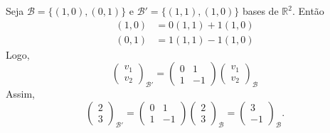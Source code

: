 \begin{exemplo*}
  Seja ${\mathcal{B}} = \{(1,0),(0,1)\}$ e ${\mathcal{B}}' = \{(1,1), (1,0)\}$ bases de ${\mathbb{R}}^2$. Então 
  \begin{align*}
    (1,0) &= 0(1,1)+1(1,0)\\
    (0,1) &= 1(1,1)-1(1,0)
  \end{align*}
  Logo,
  \begin{equation*}
    \begin{pmatrix}
      v_1\\v_2
    \end{pmatrix}_{{\mathcal{B}}'} = 
    \begin{pmatrix}
      0 & 1\\
      1 & -1
    \end{pmatrix}
    \begin{pmatrix}
      v_1\\v_2
    \end{pmatrix}_{{\mathcal{B}}}
  \end{equation*}
  Assim, 
  \begin{equation*}
     \begin{pmatrix}
        2\\3
     \end{pmatrix}_{{\mathcal{B}}'} =
     \begin{pmatrix}
        0 & 1\\ 1 & -1
     \end{pmatrix} 
     \begin{pmatrix}
        2\\3
     \end{pmatrix}_{\mathcal{B}} = 
     \begin{pmatrix}
        3\\-1
     \end{pmatrix}_{\mathcal{B}}.
  \end{equation*}
\end{exemplo*}

